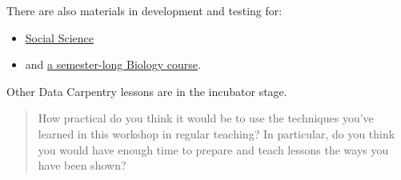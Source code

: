 There are also materials in development and testing for:

\begin{itemize}
\item
  \href{http://datacarpentry.org/lessons/\#social-science-materials}{Social
  Science}
\item
  and \href{http://datacarpentry.org/semester-biology/}{a
  semester-long Biology course}.
\end{itemize}

Other Data Carpentry lessons are in the incubator stage.

\begin{quote}
How practical do you think it would be to use the techniques you've
learned in this workshop in regular teaching? In particular, do you
think you would have enough time to prepare and teach lessons the ways
you have been shown?
\end{quote}
